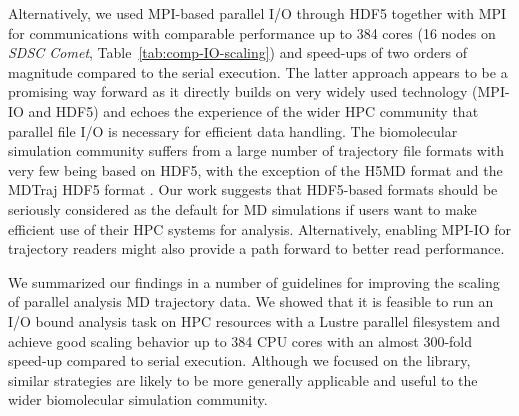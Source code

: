 Alternatively, we used MPI-based parallel I/O through HDF5 together with MPI for communications with comparable performance up to 384 cores (16 nodes on \emph{SDSC Comet}, Table~\ref{tab:comp-IO-scaling}) and speed-ups of two orders of magnitude compared to the serial execution.
The latter approach appears to be a promising way forward as it directly builds on very widely used technology (MPI-IO and HDF5) and echoes the experience of the wider HPC community that parallel file I/O is necessary for efficient data handling.
The biomolecular simulation community suffers from a large number of trajectory file formats with very few being based on HDF5, with the exception of the H5MD format \cite{Buyl:2014aa} and the MDTraj HDF5 format \cite{McGibbon:2015aa}.
Our work suggests that HDF5-based formats should be seriously considered as the default for MD simulations if users want to make efficient use of their HPC systems for analysis. 
Alternatively, enabling MPI-IO for trajectory readers might also provide a path forward to better read performance.

We summarized our findings in a number of guidelines for improving the scaling of parallel analysis MD trajectory data.
We showed that it is feasible to run an I/O bound analysis task on HPC resources with a Lustre parallel filesystem and achieve good scaling behavior up to 384 CPU cores with an almost 300-fold speed-up compared to serial execution.
Although we focused on the  library, similar strategies are likely to be more generally applicable and useful to the wider biomolecular simulation community.


